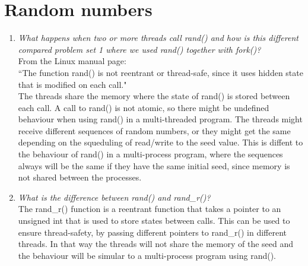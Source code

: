 \documentclass[a4paper]{article}
\begin{document}
\section{Random numbers}
 \begin{enumerate}
    \item \textit{What happens when two or more threads call rand() and how is this different compared problem set 1 where we used rand() together with fork()?} \\

      From the Linux manual page: \\
      ``The function rand() is not reentrant or thread-safe, since it uses hidden state that is modified on each call." \\
      The threads share the memory where the state of rand() is stored between each call. A call to rand() is not atomic, so there might be undefined behaviour when using rand() in a multi-threaded program. The threads might receive different sequences of random numbers, or they might get the same depending on the squeduling of read/write to the seed value. This is diffent to the behaviour of rand() in a multi-process program, where the sequences always will be the same if they have the same initial seed, since memory is not shared between the processes.

    \item \textit{What is the difference between rand() and rand\_r()?}\\

      The rand\_r() function is a reentrant function that takes a pointer to an unsigned int that is used to store states between calls. This can be used to ensure thread-safety, by passing different pointers to rand\_r() in different threads. In that way the threads will not share the memory of the seed and the behaviour will be simular to a multi-process program using rand().
      
 \end{enumerate}
\end{document}
